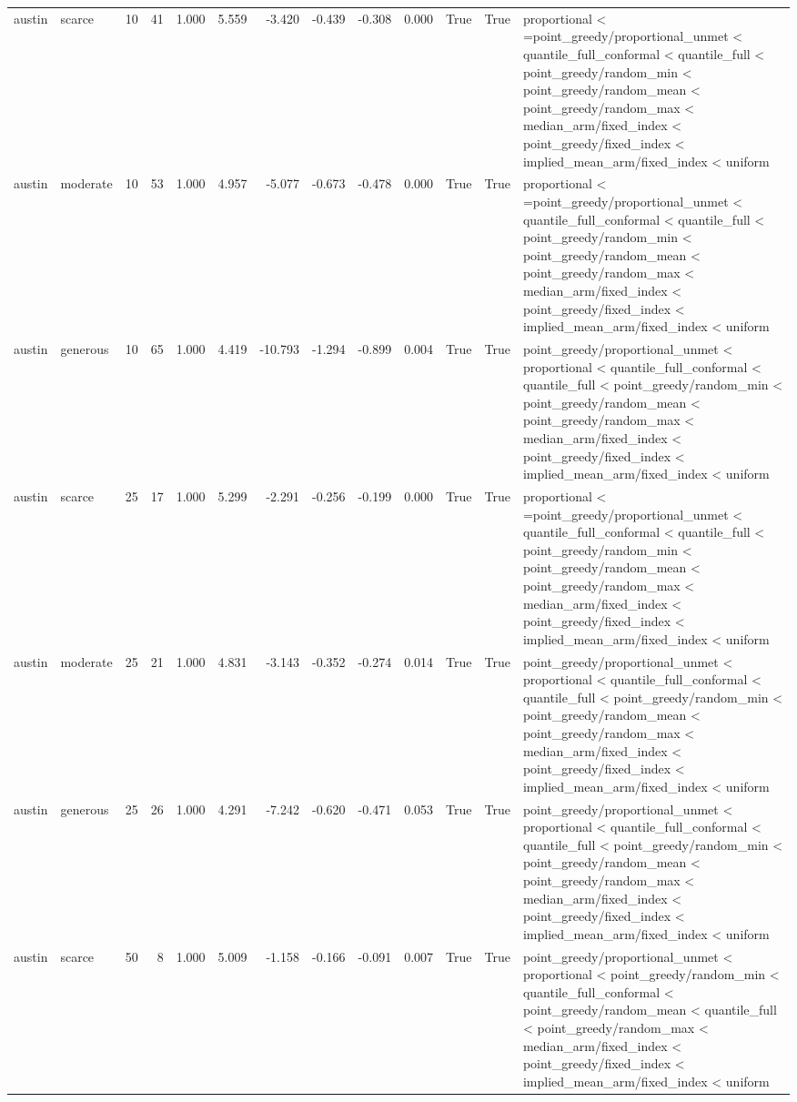 \begin{tabular}{llrrrrrrrrrrl}
austin & scarce & 10 & 41 & 1.000 & 5.559 & -3.420 & -0.439 & -0.308 & 0.000 & True & True & proportional < =point\_greedy/proportional\_unmet < quantile\_full\_conformal < quantile\_full < point\_greedy/random\_min < point\_greedy/random\_mean < point\_greedy/random\_max < median\_arm/fixed\_index < point\_greedy/fixed\_index < implied\_mean\_arm/fixed\_index < uniform \\
austin & moderate & 10 & 53 & 1.000 & 4.957 & -5.077 & -0.673 & -0.478 & 0.000 & True & True & proportional < =point\_greedy/proportional\_unmet < quantile\_full\_conformal < quantile\_full < point\_greedy/random\_min < point\_greedy/random\_mean < point\_greedy/random\_max < median\_arm/fixed\_index < point\_greedy/fixed\_index < implied\_mean\_arm/fixed\_index < uniform \\
austin & generous & 10 & 65 & 1.000 & 4.419 & -10.793 & -1.294 & -0.899 & 0.004 & True & True & point\_greedy/proportional\_unmet < proportional < quantile\_full\_conformal < quantile\_full < point\_greedy/random\_min < point\_greedy/random\_mean < point\_greedy/random\_max < median\_arm/fixed\_index < point\_greedy/fixed\_index < implied\_mean\_arm/fixed\_index < uniform \\
austin & scarce & 25 & 17 & 1.000 & 5.299 & -2.291 & -0.256 & -0.199 & 0.000 & True & True & proportional < =point\_greedy/proportional\_unmet < quantile\_full\_conformal < quantile\_full < point\_greedy/random\_min < point\_greedy/random\_mean < point\_greedy/random\_max < median\_arm/fixed\_index < point\_greedy/fixed\_index < implied\_mean\_arm/fixed\_index < uniform \\
austin & moderate & 25 & 21 & 1.000 & 4.831 & -3.143 & -0.352 & -0.274 & 0.014 & True & True & point\_greedy/proportional\_unmet < proportional < quantile\_full\_conformal < quantile\_full < point\_greedy/random\_min < point\_greedy/random\_mean < point\_greedy/random\_max < median\_arm/fixed\_index < point\_greedy/fixed\_index < implied\_mean\_arm/fixed\_index < uniform \\
austin & generous & 25 & 26 & 1.000 & 4.291 & -7.242 & -0.620 & -0.471 & 0.053 & True & True & point\_greedy/proportional\_unmet < proportional < quantile\_full\_conformal < quantile\_full < point\_greedy/random\_min < point\_greedy/random\_mean < point\_greedy/random\_max < median\_arm/fixed\_index < point\_greedy/fixed\_index < implied\_mean\_arm/fixed\_index < uniform \\
austin & scarce & 50 & 8 & 1.000 & 5.009 & -1.158 & -0.166 & -0.091 & 0.007 & True & True & point\_greedy/proportional\_unmet < proportional < point\_greedy/random\_min < quantile\_full\_conformal < point\_greedy/random\_mean < quantile\_full < point\_greedy/random\_max < median\_arm/fixed\_index < point\_greedy/fixed\_index < implied\_mean\_arm/fixed\_index < uniform \\

\end{tabular}
